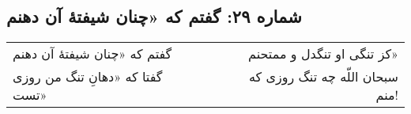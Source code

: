 \begin{center}
\section*{شماره ۲۹: گفتم که «چنان شیفتۀ آن دهنم}
\label{sec:029}
\begin{longtable}{l p{0.5cm} r}
گفتم که «چنان شیفتهٔ آن دهنم
&&
کز تنگی او تنگدل و ممتحنم»
\\
گفتا که «دهانِ تنگ من روزی تست»
&&
سبحان اللّه چه تنگ روزی که منم!
\\
\end{longtable}
\end{center}
